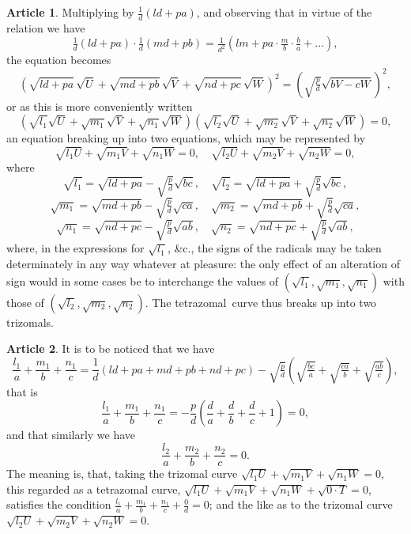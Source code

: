 \documentclass[11pt,a4paper]{article}
\theoremstyle{definition}
\newtheorem{art}{Article}
\newcommand{\tetrazomal}{tetrazomal}
\begin{document}
\begin{art}
Multiplying by $\tfrac{1}{d}(ld + pa)$, and observing that in virtue of the relation we have
\[
\tfrac{1}{d}(ld + pa) \cdot \tfrac{1}{d}(md + pb) = \tfrac{1}{d^{2}}(lm + pa \cdot \tfrac{m}{b} \cdot \tfrac{b}{a} + \ldots),
\]
the equation becomes
\[
\left(\sqrt{ld + pa}\,\sqrt{U} + \sqrt{md + pb}\,\sqrt{V} + \sqrt{nd + pc}\,\sqrt{W}\right)^{2} = \left(\sqrt{\tfrac{p}{d}}\sqrt{bV - cW}\right)^{2},
\]
or as this is more conveniently written
\[
\left(\sqrt{l_{1}}\sqrt{U} + \sqrt{m_{1}}\sqrt{V} + \sqrt{n_{1}}\sqrt{W}\right) \left(\sqrt{l_{2}}\sqrt{U} + \sqrt{m_{2}}\sqrt{V} + \sqrt{n_{2}}\sqrt{W}\right) = 0,
\]
an equation breaking up into two equations, which may be represented by
\[
\sqrt{l_{1}U} + \sqrt{m_{1}V} + \sqrt{n_{1}W} = 0, \quad \sqrt{l_{2}U} + \sqrt{m_{2}V} + \sqrt{n_{2}W} = 0,
\]
where
\[
\sqrt{l_{1}} = \sqrt{ld + pa} - \sqrt{\tfrac{p}{d}}\sqrt{bc}, \quad \sqrt{l_{2}} = \sqrt{ld + pa} + \sqrt{\tfrac{p}{d}}\sqrt{bc},
\]
\[
\sqrt{m_{1}} = \sqrt{md + pb} - \sqrt{\tfrac{p}{d}}\sqrt{ca}, \quad \sqrt{m_{2}} = \sqrt{md + pb} + \sqrt{\tfrac{p}{d}}\sqrt{ca},
\]
\[
\sqrt{n_{1}} = \sqrt{nd + pc} - \sqrt{\tfrac{p}{d}}\sqrt{ab}, \quad \sqrt{n_{2}} = \sqrt{nd + pc} + \sqrt{\tfrac{p}{d}}\sqrt{ab},
\]
where, in the expressions for $\sqrt{l_{1}}$, \&c., the signs of the radicals may be taken determinately in any way whatever at pleasure: the only effect of an alteration of sign would in some cases be to interchange the values of $(\sqrt{l_{1}}, \sqrt{m_{1}}, \sqrt{n_{1}})$ with those of $(\sqrt{l_{2}}, \sqrt{m_{2}}, \sqrt{n_{2}})$. The \tetrazomal\ curve thus breaks up into two trizomals.
\end{art}

\begin{art}
It is to be noticed that we have
\[
\frac{l_{1}}{a} + \frac{m_{1}}{b} + \frac{n_{1}}{c} = \frac{1}{d}(ld + pa + md + pb + nd + pc) - \sqrt{\tfrac{p}{d}}\left(\sqrt{\tfrac{bc}{a}} + \sqrt{\tfrac{ca}{b}} + \sqrt{\tfrac{ab}{c}}\right),
\]
that is
\[
\frac{l_{1}}{a} + \frac{m_{1}}{b} + \frac{n_{1}}{c} = -\frac{p}{d}\left(\frac{d}{a} + \frac{d}{b} + \frac{d}{c} + 1\right) = 0,
\]
and that similarly we have
\[
\frac{l_{2}}{a} + \frac{m_{2}}{b} + \frac{n_{2}}{c} = 0.
\]
The meaning is, that, taking the trizomal curve $\sqrt{l_{1}U} + \sqrt{m_{1}V} + \sqrt{n_{1}W} = 0$, this regarded as a tetrazomal curve, $\sqrt{l_{1}U} + \sqrt{m_{1}V} + \sqrt{n_{1}W} + \sqrt{0 \cdot T} = 0$, satisfies the condition $\tfrac{l_{1}}{a} + \tfrac{m_{1}}{b} + \tfrac{n_{1}}{c} + \tfrac{0}{d} = 0$; and the like as to the trizomal curve $\sqrt{l_{2}U} + \sqrt{m_{2}V} + \sqrt{n_{2}W} = 0$.
\end{art}
\end{document}
